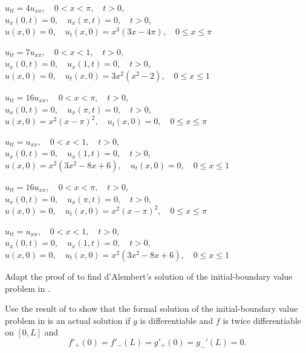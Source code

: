 \begin{exerciselist}
\item\label{exer:12.2.54}\Cex
$u_{tt}=4u_{xx},\quad 0<x<\pi,\quad t>0$,\\
$u_x(0,t)=0,\quad u_x(\pi,t)=0,\quad t>0$,\\
$u(x,0)=0,\quad u_t(x,0)=x^3(3x-4\pi),\quad0\le x\le \pi$

\item\label{exer:12.2.55}$u_{tt}=7u_{xx},\quad 0<x<1,\quad t>0$,\\
$u_x(0,t)=0,\quad u_x(1,t)=0,\quad t>0$,\\
$u(x,0)=0,\quad u_t(x,0)=3x^2(x^2-2),\quad0\le x\le 1$

\item\label{exer:12.2.56}$u_{tt}=16u_{xx},\quad 0<x<\pi,\quad t>0$,\\
$u_x(0,t)=0,\quad u_x(\pi,t)=0,\quad t>0$,\\
$u(x,0)=x^2(x-\pi)^2,\quad u_t(x,0)=0,\quad0\le x\le \pi$

\item\label{exer:12.2.57}\Cex
$u_{tt}=u_{xx},\quad 0<x<1,\quad t>0$,\\
$u_x(0,t)=0,\quad u_x(1,t)=0,\quad t>0$,\\
$u(x,0)=x^2(3x^2-8x+6),\quad u_t(x,0)=0,\quad0\le x\le 1$

\item\label{exer:12.2.58}$u_{tt}=16u_{xx},\quad 0<x<\pi,\quad t>0$,\\
$u_x(0,t)=0,\quad u_x(\pi,t)=0,\quad t>0$,\\
$u(x,0)=0,\quad u_t(x,0)=x^2(x-\pi)^2,\quad0\le x\le \pi$

\item\label{exer:12.2.59}\Cex
$u_{tt}=u_{xx},\quad 0<x<1,\quad t>0$,\\
$u_x(0,t)=0,\quad u_x(1,t)=0,\quad t>0$,\\
$u(x,0)=0,\quad u_t(x,0)=x^2(3x^2-8x+6),\quad0\le x\le 1$


\item\label{exer:12.2.60}Adapt the proof of 
to find d'Alembert's solution of the initial-boundary value problem
in .

\item\label{exer:12.2.61}Use the result of  to show that the formal
solution of the initial-boundary value problem in
is an actual solution if $g$ is differentiable and $f$ is twice
differentiable on $[0,L]$ and
\[
f'_+(0)=f'_-(L)=g'_+(0)=g_-'(L)=0.
\]



\end{exerciselist}
